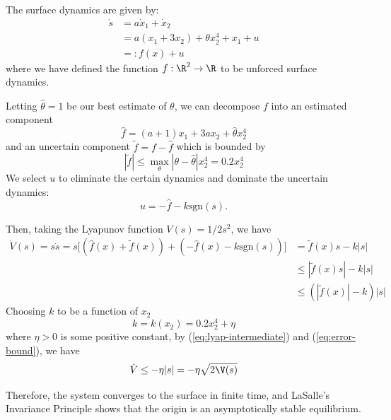 \documentclass{homework}
\begin{document}
The surface dynamics are given by:
\begin{align*}
    \dot{s} &= a\dot{x}_1 + \dot{x}_2 \\
        &= a(x_1 + 3x_2) + \theta x_2^4 + x_1 + u \\
        &=: f(x) + u
\end{align*}
where we have defined the function $f: \R^2 \to \R$ to be unforced surface dynamics.

Letting $\hat{\theta} = 1$ be our best estimate of $\theta$, we can decompose
$f$ into an estimated component
\begin{equation*}
    \hat{f} = (a+1) x_1 + 3a x_2 + \hat{\theta} x_2^4
\end{equation*}
and an uncertain component $\tilde{f} = f - \hat{f}$ which is bounded by
\begin{equation}
    |\tilde{f}| \leq \max_{\theta} |\theta - \hat{\theta}| x_2^4 = 0.2 x_2^4
    \label{eq:error-bound}
\end{equation}
We select $u$ to eliminate the certain dynamics and dominate the uncertain
dynamics:
\begin{equation*}
    u = -\hat{f} - k \text{sgn}(s).
\end{equation*}

Then, taking the Lyapunov function $V(s) = 1/2 s^2$, we have
\begin{align}
    \dot{V}(s) = s \dot{s} = s \bigl[(\hat{f}(x) + \tilde{f}(x)) +
                                      (- \hat{f}(x) - k \text{sgn}(s))\bigr]
        &= \tilde{f}(x) s - k |s| \\
        &\leq |\tilde{f}(x) s| - k|s| \\
        &\leq (|\tilde{f}(x)| - k) |s|
        \label{eq:lyap-intermediate}
\end{align}
Choosing $k$ to be a function of $x_2$
\begin{equation*}
    k = k(x_2) = 0.2 x_2^4 + \eta
\end{equation*}
where $\eta > 0$ is some positive constant, by (\ref{eq:lyap-intermediate})
and (\ref{eq:error-bound}), we have
\begin{equation*}
    \dot{V} \leq - \eta |s| = - \eta \sqrt{2 \V(s)}
\end{equation*}

Therefore, the system converges to the surface in finite time, and
LaSalle's Invariance Principle shows that the origin is an asymptotically stable
equilibrium.
\end{document}
